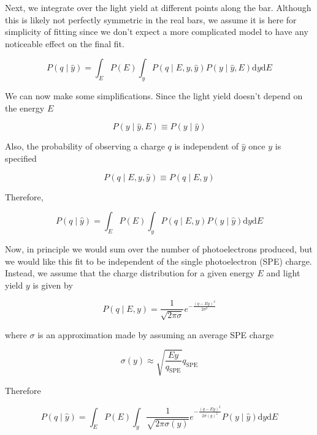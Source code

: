 \documentclass[12pt,openright,twoside]{report}
\begin{document}
Next, we integrate over the light yield at different points along the bar.
Although this is likely not perfectly symmetric in the real bars, we assume it
is here for simplicity of fitting since we don't expect a more complicated
model to have any noticeable effect on the final fit.

\begin{equation}
P(q\mid \hat{y}) = \int_E P(E) \int_y P(q\mid E, y, \hat{y}) P(y\mid \hat{y}, E) \mathrm{d}y \mathrm{d}E
\label{eq:prob-q}
\end{equation}

We can now make some simplifications. Since the light yield doesn't depend on the energy $E$

\begin{equation}
P(y\mid \hat{y}, E) \equiv P(y\mid \hat{y})
\end{equation}

Also, the probability of observing a charge $q$ is independent of $\hat{y}$ once $y$ is specified

\begin{equation}
P(q\mid E, y, \hat{y}) \equiv P(q\mid E, y)
\end{equation}

Therefore,

\begin{equation}
P(q\mid \hat{y}) = \int_E P(E) \int_y P(q\mid E, y) P(y\mid \hat{y}) \mathrm{d}y \mathrm{d}E
\end{equation}

Now, in principle we would sum over the number of photoelectrons produced, but
we would like this fit to be independent of the single photoelectron (SPE)
charge. Instead, we assume that the charge distribution for a given energy $E$
and light yield $y$ is given by

\begin{equation}
P(q\mid E, y) = \frac{1}{\sqrt{2 \pi \sigma}}e^{-\frac{(q-E y)^2}{2\sigma^2}}
\end{equation}

where $\sigma$ is an approximation made by assuming an average SPE charge

\begin{equation}
\sigma(y) \approx \sqrt{\frac{E y}{q_\mathrm{SPE}}}q_\mathrm{SPE}
\end{equation}

Therefore

\begin{equation}
P(q\mid \hat{y}) = \int_E P(E) \int_y \frac{1}{\sqrt{2 \pi \sigma(y)}}e^{-\frac{(q-E y)^2}{2\sigma(y)^2}} P(y\mid \hat{y}) \mathrm{d}y \mathrm{d}E
\end{equation}
\end{document}
